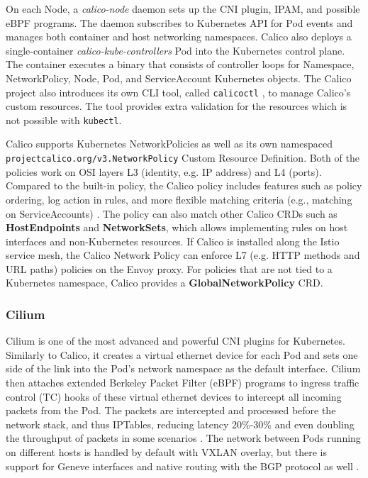 \documentclass[english, 12pt, a4paper, sci, utf8, a-2b, online]{aaltothesis}
\newcommand{\mycomment}[3]{\textcolor{#1}{#2:~#3}}
\newcommand{\jb}[1]{\noindent\mycomment{aaltoRed}{JB}{#1}}
\begin{document}
On each Node, a \emph{calico-node} daemon sets up the CNI plugin, IPAM, and possible eBPF programs.
The daemon subscribes to Kubernetes API for Pod events and manages both container and host networking namespaces.
Calico also deploys a single-container \emph{calico-kube-controllers} Pod into the Kubernetes control plane.
The container executes a binary that consists of controller loops for Namespace, NetworkPolicy, Node, Pod, and ServiceAccount Kubernetes objects.
The Calico project also introduces its own CLI tool, called \lstinline{calicoctl} \cite{calicoctl}, to manage Calico's custom resources.
The tool provides extra validation for the resources which is not possible with \lstinline{kubectl}.

Calico supports Kubernetes NetworkPolicies as well as its own namespaced \lstinline{projectcalico.org/v3.NetworkPolicy} Custom Resource Definition.
Both of the policies work on OSI layers L3 (identity, e.g. IP address) and L4 (ports).
Compared to the built-in policy, the Calico policy includes features such as policy ordering, log action in rules, and more flexible matching criteria (e.g., matching on ServiceAccounts) \cite{calico-network-policy}.
The policy can also match other Calico CRDs such as \textbf{HostEndpoints} and \textbf{NetworkSets}, which allows implementing rules on host interfaces and non-Kubernetes resources.
If Calico is installed along the Istio service mesh, the Calico Network Policy can enforce L7 (e.g. HTTP methods and URL paths) policies on the Envoy proxy. For policies that are not tied to a Kubernetes namespace, Calico provides a \textbf{GlobalNetworkPolicy} CRD.


\subsubsection{Cilium}

Cilium \cite{cilium} is one of the most advanced and powerful CNI plugins for Kubernetes.
Similarly to Calico, it creates a virtual ethernet device for each Pod and sets one side of the link into the Pod's network namespace \cite{cilium-tkng} as the default interface.
Cilium then attaches extended Berkeley Packet Filter (eBPF) programs to ingress traffic control (TC) hooks of these virtual ethernet devices to intercept all incoming packets from the Pod.
The packets are intercepted and processed before the network stack, and thus IPTables, reducing latency 20\%-30\% and even doubling the throughput of packets in some scenarios \cite{budigiri2021network}.
The network between Pods running on different hosts is handled by default with VXLAN overlay, but there is support for Geneve interfaces and native routing with the BGP protocol as well \cite{cilium}.
\end{document}
